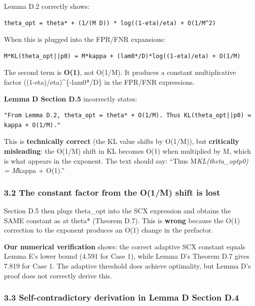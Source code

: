 \documentclass[
  12pt,
]{ctexart}
\begin{document}
Lemma D.2 correctly shows:

\begin{verbatim}
theta_opt = theta* + (1/(M D)) * log((1-eta)/eta) + O(1/M^2)
\end{verbatim}

When this is plugged into the FPR/FNR expansions:

\begin{verbatim}
M*KL(theta_opt||p0) = M*kappa + (lam0*/D)*log((1-eta)/eta) + O(1/M)
\end{verbatim}

The second term is \textbf{O(1)}, not O(1/M). It produces a constant
multiplicative factor ((1-eta)/eta)\^{}\{-lam0*/D\} in the FPR/FNR
expressions.

\textbf{Lemma D Section D.5} incorrectly states:

\begin{verbatim}
"From Lemma D.2, theta_opt = theta* + O(1/M). Thus KL(theta_opt||p0) = kappa + O(1/M)."
\end{verbatim}

This is \textbf{technically correct} (the KL value shifts by O(1/M)),
but \textbf{critically misleading}: the O(1/M) shift in KL becomes O(1)
when multiplied by M, which is what appears in the exponent. The text
should say: ``Thus M\emph{KL(theta\_opt\textbar\textbar p0) = M}kappa +
O(1).''

\subsubsection{3.2 The constant factor from the O(1/M) shift is
lost}\label{the-constant-factor-from-the-o1m-shift-is-lost}

Section D.5 then plugs theta\_opt into the SCX expression and obtains
the SAME constant as at theta* (Theorem D.7). This is \textbf{wrong}
because the O(1) correction to the exponent produces an O(1) change in
the prefactor.

\textbf{Our numerical verification} shows: the correct adaptive SCX
constant equals Lemma E's lower bound (4.591 for Case 1), while Lemma
D's Theorem D.7 gives 7.819 for Case 1. The adaptive threshold does
achieve optimality, but Lemma D's proof does not correctly derive this.

\subsubsection{3.3 Self-contradictory derivation in Lemma D Section
D.4}\label{self-contradictory-derivation-in-lemma-d-section-d.4}
\end{document}
